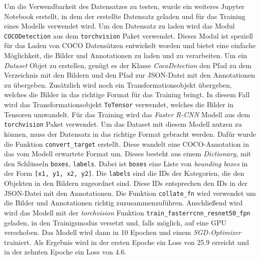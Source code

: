 Um die Verwendbarkeit des Datensatzes zu testen, wurde ein weiteres Jupyter Notebook erstellt, in dem der erstellte Datensatz geladen und für das Training eines Modells verwendet wird.
Um den Datensatz zu laden wird das Modul \texttt{COCODetection} aus dem \texttt{torchvision} Paket verwendet. Dieses Modul ist speziell für das Laden von COCO Datensätzen entwickelt worden und bietet eine einfache Möglichkeit, die Bilder und Annotationen zu laden und zu verarbeiten. 
Um ein \emph{Dataset} Objet zu erstellen, genügt es der Klasse \emph{CocoDetection} den Pfad zu dem Verzeichnis mit den Bildern und den Pfad zur JSON-Datei mit den Annotationen zu übergeben. Zusätzlich wird noch ein Transformationsobjekt übergeben, welches die Bilder in das richtige Format für das Training bringt. In diesem Fall wird das Transformationsobjekt \texttt{ToTensor} verwendet, welches die Bilder in Tensoren umwandelt.
Für das Training wird das \emph{Faster R-CNN} Modell aus dem \texttt{torchvision} Paket verwendet.
Um das Dataset mit diesem Modell nutzen zu können, muss der Datensatz in das richtige Format gebracht werden. Dafür wurde die Funktion \texttt{convert\_target} erstellt. Diese wandelt eine COCO-Annotation in das vom Modell erwartete Format um. Dieses besteht aus einem \emph{Dictionary}, mit den Schlüsseln \texttt{boxes}, \texttt{labels}. Dabei ist \texttt{boxes} eine Liste von \emph{bounding boxes} in der Form \texttt{[x1, y1, x2, y2]}. Die \texttt{labels} sind die IDs der Kategorien, die den Objekten in den Bildern zugeordnet sind. Diese IDs entsprechen den IDs in der JSON-Datei mit den Annotationen.
Die Funktion \texttt{collate\_fn} wird verwendet um die Bilder und Annotationen richtig zuzusammenzuführen.
Anschließend wird wird das Modell mit der \emph{torchvision} Funktion \texttt{train\_fasterrcnn\_resnet50\_fpn} geladen, in den Trainigsmodus versetzt und, falls möglich, auf eine GPU verschoben. Das Modell wird dann in 10 Epochen und einem \emph{SGD-Optimizer} trainiert.
Als Ergebnis wird in der ersten Epoche ein Loss von 25.9 erreicht und in der zehnten Epoche ein Loss von 4.6.

